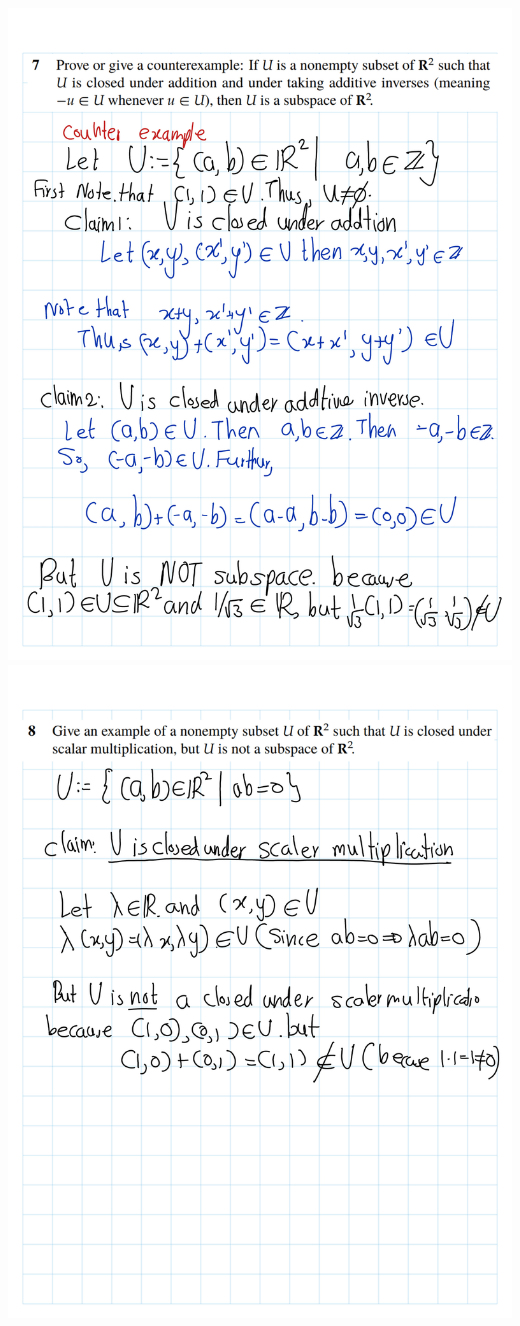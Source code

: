 \documentclass[
]{book}
\theoremstyle{definition}
\theoremstyle{definition}
\theoremstyle{definition}
\theoremstyle{definition}
\theoremstyle{remark}
\begin{document}
\begin{enumerate}
  \includegraphics{fig/Ex1C/Ex/Ex-04.png}
  \includegraphics{fig/Ex1C/Ex/Ex-05.png}

\end{enumerate}
\end{document}
